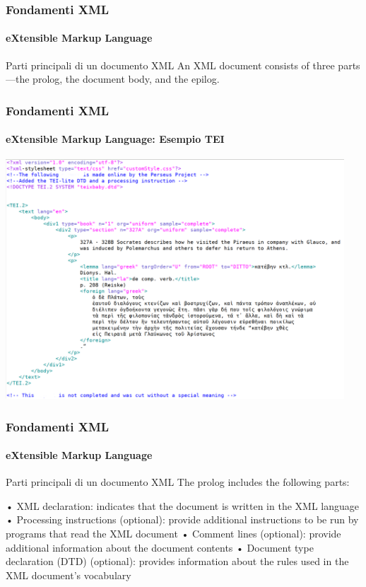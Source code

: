 \begin{frame}
	\frametitle{Fondamenti XML}
	\framesubtitle{eXtensible Markup Language}
	\addtocounter{nframe}{1}

	\begin{block}{Parti principali di un documento XML}
        An XML document consists of three parts—the prolog, the document body, and the
        epilog. 
	\end{block}

\end{frame}


\begin{frame}
	\frametitle{Fondamenti XML}
	\framesubtitle{eXtensible Markup Language: Esempio TEI}
	\addtocounter{nframe}{1}

	\begin{center}
		\includegraphics[width=0.95\textwidth]{imgs/xml-TEI-PerseusExample.png}
	\end{center}

\end{frame}


\begin{frame}
	\frametitle{Fondamenti XML}
	\framesubtitle{eXtensible Markup Language}
	\addtocounter{nframe}{1}

	\begin{block}{Parti principali di un documento XML}
        The prolog includes the following parts:
        
        • XML declaration: indicates that the document is written in the XML language
        • Processing instructions (optional): provide additional instructions to be run by
        programs that read the XML document
        • Comment lines (optional): provide additional information about the document
        contents
        • Document type declaration (DTD) (optional): provides information about the rules
        used in the XML document’s vocabulary
	\end{block}

\end{frame}

